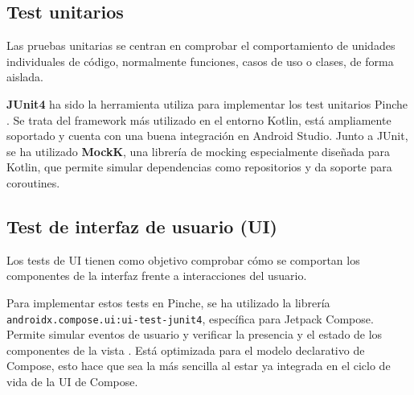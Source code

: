 \subsection{Test unitarios}

Las pruebas unitarias se centran en comprobar el comportamiento de unidades individuales de código, normalmente funciones, casos de uso o clases, de forma aislada.

\textbf{JUnit4} ha sido la herramienta utiliza para implementar los test unitarios Pinche \cite{android-testing}. Se trata del framework más utilizado en el entorno Kotlin, está ampliamente soportado y cuenta con una buena integración en Android Studio. Junto a JUnit, se ha utilizado \textbf{MockK}, una librería de mocking especialmente diseñada para Kotlin, que permite simular dependencias como repositorios y da soporte para coroutines.

\subsection{Test de interfaz de usuario (UI)}

Los tests de UI tienen como objetivo comprobar cómo se comportan los componentes de la interfaz frente a interacciones del usuario.

Para implementar estos tests en Pinche, se ha utilizado la librería \texttt{androidx.compose.ui:ui-test-junit4}, específica para Jetpack Compose. Permite simular eventos de usuario y verificar la presencia y el estado de los componentes de la vista \cite{android-testing}. Está optimizada para el modelo declarativo de Compose, esto hace que sea la más sencilla al estar ya integrada en el ciclo de vida de la UI de Compose.
